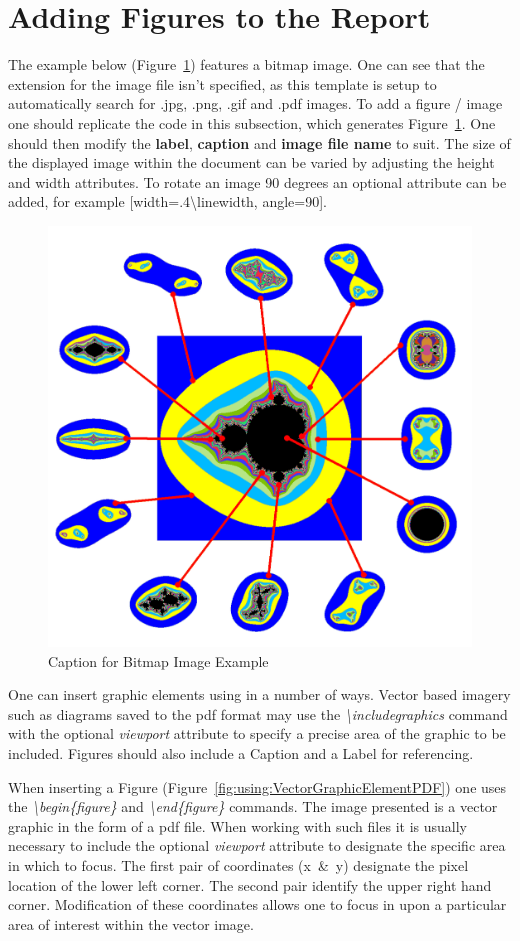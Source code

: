 \section{Adding Figures to the Report}
The example below (Figure~\ref{fig:using:samplepngImage}) features a bitmap image. One can see that the extension for the image file isn't specified, as this template is setup to automatically search for .jpg, .png, .gif and .pdf images. To add a figure / image one should replicate the code in this subsection, which generates Figure~\ref{fig:using:samplepngImage}. One should then modify the \textbf{label}, \textbf{caption} and \textbf{image file name} to suit. The size of the displayed image within the document can be varied by adjusting the height and width attributes. To rotate an image 90 degrees an optional attribute can be added, for example [width=.4\textbackslash linewidth, angle=90].

\begin{figure}[H]
\begin{center}
\includegraphics[width=.34\linewidth]{usingLatex/images/samplepng}
\caption{Caption for Bitmap Image Example} \label{fig:using:samplepngImage}
\end{center}
\end{figure}

 One can insert graphic elements using \latex in a number of ways. Vector based imagery such as diagrams saved to the pdf format may use the \emph{\textbackslash includegraphics} command with the optional \emph{viewport} attribute to specify a precise area of the graphic to be included. Figures should also include a Caption and a Label for referencing.

When inserting a Figure (Figure~\ref{fig:using:VectorGraphicElementPDF}) one uses the \emph{\textbackslash begin\{figure\}} and \emph{\textbackslash end\{figure\}} commands. The image presented is a vector graphic in the form of a pdf file. When working with such files it is usually necessary to include the optional \emph{viewport} attribute to designate the specific area in which to focus. The first pair of coordinates (x~\&~y) designate the pixel location of the lower left corner. The second pair identify the upper right hand corner. Modification of these coordinates allows one to focus in upon a particular area of interest within the vector image. 


